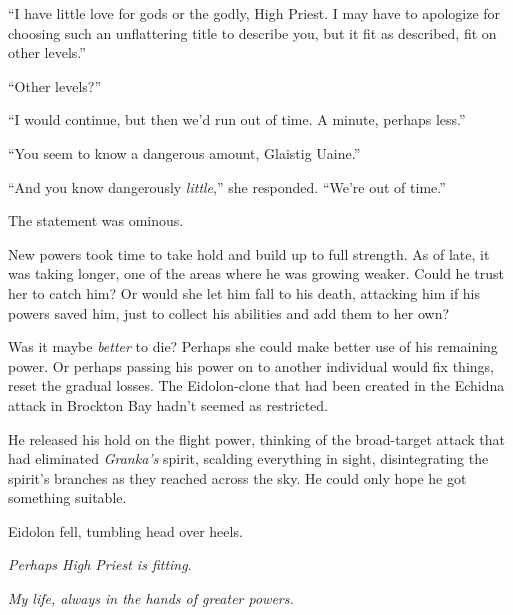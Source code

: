 ``I have little love for gods or the godly, High Priest.  I may have to apologize for choosing such an unflattering title to describe you, but it fit as described, fit on other levels.''



``Other levels?''



``I would continue, but then we'd run out of time.  A minute, perhaps less.''



``You seem to know a dangerous amount, Glaistig Uaine.''



``And you know dangerously \emph{little},'' she responded.  ``We're out of time.''



The statement was ominous.



New powers took time to take hold and build up to full strength.  As of late, it was taking longer, one of the areas where he was growing weaker.  Could he trust her to catch him?  Or would she let him fall to his death, attacking him if his powers saved him, just to collect his abilities and add them to her own?



Was it maybe \emph{better} to die?  Perhaps she could make better use of his remaining power.  Or perhaps passing his power on to another individual would fix things, reset the gradual losses.  The Eidolon-clone that had been created in the Echidna attack in Brockton Bay hadn't seemed as restricted.



He released his hold on the flight power, thinking of the broad-target attack that had eliminated \emph{Granka's} spirit, scalding everything in sight, disintegrating the spirit's branches as they reached across the sky.  He could only hope he got something suitable.



Eidolon fell, tumbling head over heels.



\emph{Perhaps High Priest is fitting}.



\emph{My life, always in the hands of greater powers.}



\sectionbreak






